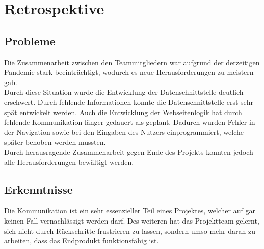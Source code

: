 \chapter{Retrospektive}
\section{Probleme}
Die Zusammenarbeit zwischen den Teammitgliedern war aufgrund der derzeitigen Pandemie stark beeinträchtigt, wodurch es neue Herausforderungen zu meistern gab.\\

Durch diese Situation wurde die Entwicklung der Datenschnittstelle deutlich erschwert. Durch fehlende Informationen konnte die Datenschnittstelle erst sehr spät entwickelt werden. Auch die Entwicklung der Webseitenlogik hat durch fehlende Kommunikation länger gedauert als geplant. Dadurch wurden Fehler in der Navigation sowie bei den Eingaben des Nutzers einprogrammiert, welche später behoben werden mussten.\\

Durch herausragende Zusammenarbeit gegen Ende des Projekts konnten jedoch alle Herausforderungen bewältigt werden.
\section{Erkenntnisse}
Die Kommunikation ist ein sehr essenzieller Teil eines Projektes, welcher auf gar keinen Fall vernachlässigt werden darf. Des weiteren hat das Projektteam gelernt, sich nicht durch Rückschritte frustrieren zu lassen, sondern umso mehr daran zu arbeiten, dass das Endprodukt funktionsfähig ist.
\newpage

